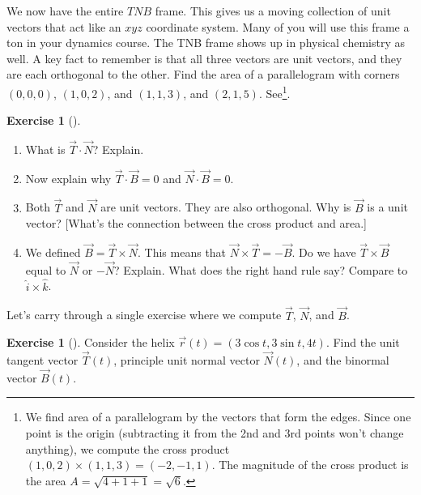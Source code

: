 \documentclass[10pt,]{book}
\theoremstyle{plain}
\theoremstyle{definition}
\theoremstyle{definition}
\theoremstyle{definition}
\theoremstyle{definition}
\newtheorem{exploration}[project]{Exercise}
\theoremstyle{definition}
\numberwithin{equation}{section}
\begin{document}
We now have the entire \(TNB\) frame. This gives us a moving collection of unit vectors that act like an \(xyz\) coordinate system. Many of you will use this frame a ton in your dynamics course. The TNB frame shows up in physical chemistry as well. A key fact to remember is that all three vectors are unit vectors, and they are each orthogonal to the other.%
Find the area of a parallelogram with corners \((0,0,0)\), \((1,0,2)\), and \((1,1,3)\), and \((2,1,5)\). See\footnote{We find area of a parallelogram by the vectors that form the edges. Since one point is the origin (subtracting it from the 2nd and 3rd points won't change anything), we compute the cross product \((1,0,2)\times 
(1,1,3) 
= (-2,-1,1)\). The magnitude of the cross product is the area \(A = \sqrt{4+1+1}=\sqrt{6}\).\label{fn-13}}.%
\begin{exploration}[]\label{exploration-178}
\leavevmode%
\begin{enumerate}[font=\bfseries,label=(\alph*),ref=\alph*]
\item\label{task-438} What is \(\vec T\cdot \vec N\)? Explain.%
\item\label{task-439} Now explain why \(\vec T\cdot \vec B=0\) and \(\vec N\cdot \vec B=0\).%
\item\label{task-440} Both \(\vec T\) and \(\vec N\) are unit vectors. They are also orthogonal. Why is \(\vec B\) is a unit vector? [What's the connection between the cross product and area.]%
\item\label{task-441} We defined \(\vec B=\vec T\times \vec N\). This means that \(\vec N\times \vec T=-\vec B\).  Do we have \(\vec T\times \vec B\) equal to \(\vec N\) or \(-\vec N\)? Explain. What does the right hand rule say? Compare to \(\hat i\times \hat k\).%
%
\end{enumerate}
\end{exploration}
Let's carry through a single exercise where we compute \(\vec T\), \(\vec N\), and \(\vec B\).%
\begin{exploration}[]\label{helix_example_of_T_N_and_B}
Consider the helix \(\vec r(t) = (3\cos t,3\sin t, 4t)\). Find the unit tangent vector \(\vec T(t)\), principle unit normal vector \(\vec N(t)\), and the binormal vector \(\vec B(t)\).%
\end{exploration}
\typeout{************************************************}
\typeout{************************************************}
\end{document}
